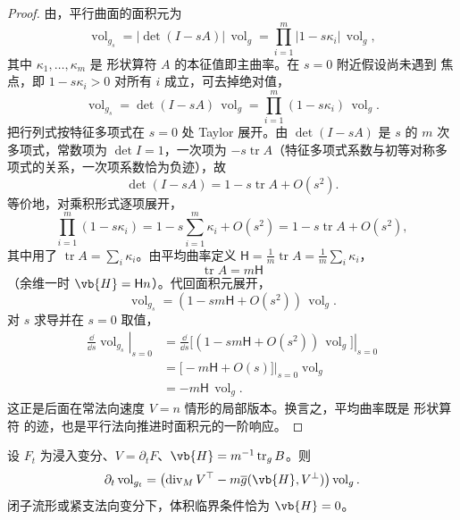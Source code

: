 \begin{proof}
由，平行曲面的面积元为
\begin{equation*}
\operatorname{vol}_{g_s}=|\det(I-sA)|\,\operatorname{vol}_g
=\prod_{i=1}^m|1-s\kappa_i|\,\operatorname{vol}_g,
\end{equation*}
其中 $\kappa_1,\ldots,\kappa_m$ 是 形状算符 $A$ 的本征值即主曲率。在 $s=0$ 附近假设尚未遇到 焦点，即 $1-s\kappa_i>0$ 对所有 $i$ 成立，可去掉绝对值，
\begin{equation*}
\operatorname{vol}_{g_s}=\det(I-sA)\,\operatorname{vol}_g
=\prod_{i=1}^m(1-s\kappa_i)\,\operatorname{vol}_g.
\end{equation*}
把行列式按特征多项式在 $s=0$ 处 Taylor 展开。由 $\det(I-sA)$ 是 $s$ 的 $m$ 次多项式，常数项为 $\det I=1$，一次项为 $-s\operatorname{tr}A$（特征多项式系数与初等对称多项式的关系，一次项系数恰为负迹），故
\begin{equation*}
\det(I-sA)=1-s\operatorname{tr}A+O(s^2).
\end{equation*}
等价地，对乘积形式逐项展开，
\begin{equation*}
\prod_{i=1}^m(1-s\kappa_i)
=1-s\sum_{i=1}^m\kappa_i+O(s^2)
=1-s\operatorname{tr}A+O(s^2),
\end{equation*}
其中用了 $\operatorname{tr}A=\sum_i\kappa_i$。由平均曲率定义 $\mathsf H=\frac1m\operatorname{tr}A=\frac1m\sum_i\kappa_i$，
\begin{equation*}
\operatorname{tr}A=m\mathsf H
\end{equation*}
（余维一时 $\vb{H}=\mathsf H n$）。代回面积元展开，
\begin{equation*}
\operatorname{vol}_{g_s}=(1-sm\mathsf H+O(s^2))\,\operatorname{vol}_g.
\end{equation*}
对 $s$ 求导并在 $s=0$ 取值，
\begin{align*}
\left.\frac{\dd}{\dd s}\operatorname{vol}_{g_s}\right|_{s=0}
&=\left.\frac{\dd}{\dd s}\bigl[(1-sm\mathsf H+O(s^2))\,\operatorname{vol}_g\bigr]\right|_{s=0}\\
&=\bigl[-m\mathsf H+O(s)\bigr]\Big|_{s=0}\operatorname{vol}_g\\
&=-m\mathsf H\,\operatorname{vol}_g.
\end{align*}
这正是后面在常法向速度 $V=n$ 情形的局部版本。换言之，平均曲率既是 形状算符 的迹，也是平行法向推进时面积元的一阶响应。
\end{proof}

\begin{proposition}[浸入体积的一阶变分]
设 $F_t$ 为浸入变分、$V=\partial_tF$、$\vb{H}=m^{-1}\operatorname{tr}_gB$。则\[\partial_t\operatorname{vol}_{g_t}=\bigl(\operatorname{div}_MV^\top-m\overline g(\vb{H},V^\perp)\bigr)\operatorname{vol}_g.\]闭子流形或紧支法向变分下，体积临界条件恰为 $\vb{H}=0$。
\end{proposition}

